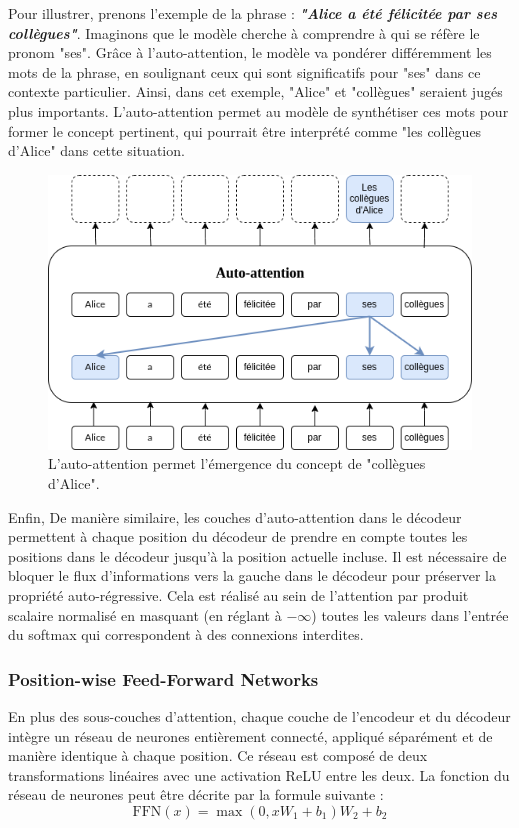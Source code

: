 Pour illustrer, prenons l'exemple de la phrase : \textbf{\textit{"Alice a été félicitée par ses collègues"}}. Imaginons que le modèle cherche à comprendre à qui se réfère le pronom "ses". Grâce à l'auto-attention, le modèle va pondérer différemment les mots de la phrase, en soulignant ceux qui sont significatifs pour "ses" dans ce contexte particulier. Ainsi, dans cet exemple, "Alice" et "collègues" seraient jugés plus importants. L'auto-attention permet au modèle de synthétiser ces mots pour former le concept pertinent, qui pourrait être interprété comme "les collègues d'Alice" dans cette situation.
\begin{figure}[H]
    \centering
    \includegraphics[width=12cm]{gfx/figure-self-attention.png}
    \caption[]{L'auto-attention permet l'émergence du concept de "collègues d'Alice". \cite{Caelen_Blete_2023}}
    \label{fig:attention-vs-multihead}
\end{figure}

Enfin, De manière similaire, les couches d'auto-attention dans le décodeur permettent à chaque position du décodeur de prendre en compte toutes les positions dans le décodeur jusqu'à la position actuelle incluse. Il est nécessaire de bloquer le flux d'informations vers la gauche dans le décodeur pour préserver la propriété auto-régressive. Cela est réalisé au sein de l'attention par produit scalaire normalisé en masquant (en réglant à $-\infty$) toutes les valeurs dans l'entrée du softmax qui correspondent à des connexions interdites.

\subsubsection{Position-wise Feed-Forward Networks}

En plus des sous-couches d'attention, chaque couche de l'encodeur et du décodeur intègre un réseau de neurones entièrement connecté, appliqué séparément et de manière identique à chaque position. Ce réseau est composé de deux transformations linéaires avec une activation ReLU entre les deux. La fonction du réseau de neurones peut être décrite par la formule suivante : 
\begin{equation}
    \text{FFN}(x) = \max(0, xW_1 + b_1)W_2 + b_2
\end{equation}

